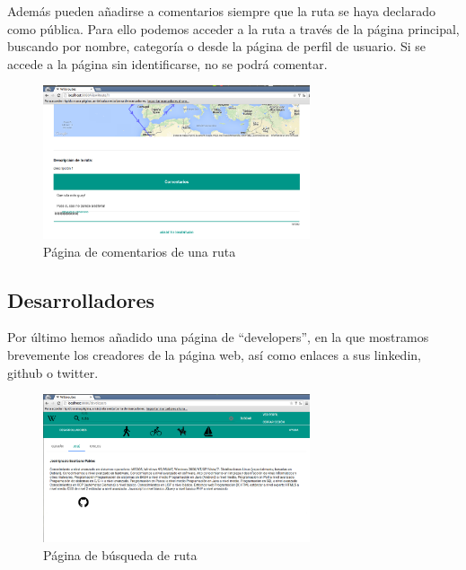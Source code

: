 \documentclass[11pt,a4paper]{article}
\begin{document}
Además pueden añadirse a comentarios siempre que la ruta se haya declarado como pública. Para ello podemos acceder a la ruta a través de la página principal, buscando por nombre, categoría o desde la página de perfil de usuario. Si se accede a la página sin identificarse, no se podrá comentar.
\begin{figure}[h]
\centering
  \includegraphics[width=0.7\textwidth]{./imagenes/comentarios}
  \caption{Página de comentarios de una ruta}
  \label{fig: Página de comentarios de una ruta}
\end{figure}

\subsection{Desarrolladores}
Por último hemos añadido una página de ``developers'', en la que mostramos brevemente los creadores de la página web, así como enlaces a sus linkedin, github o twitter.
\begin{figure}[h]
\centering
  \includegraphics[width=0.7\textwidth]{./imagenes/developers}
  \caption{Página de búsqueda de ruta}
  \label{fig: Página de búsqueda de developers}
\end{figure}

\clearpage
\end{document}
